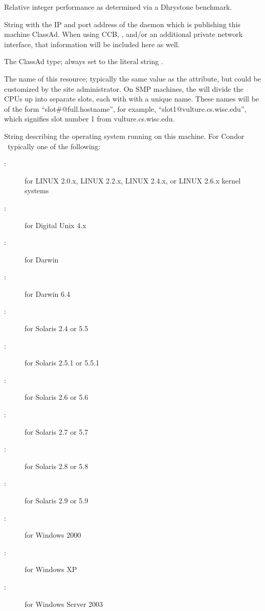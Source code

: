 \begin{description}
%
\item[\AdAttr{Mips}:] Relative integer performance as determined via a Dhrystone
benchmark.
%
\item[\AdAttr{MyAddress}:] String with the IP and port address of the
 daemon which is publishing this machine ClassAd.
When using CCB, , and/or an additional private
network interface, that information will be included here as well.
%
\item[\AdAttr{MyType}:] The ClassAd type; always set to the literal string .
%
\item[\AdAttr{Name}:] The name of this resource; typically the same value as
the  attribute, but could be customized by the site
administrator.
On SMP machines, the  will divide the CPUs up into separate
slots, each with with a unique name.
These names will be of the form ``slot\#@full.hostname'', for example,
``slot1@vulture.cs.wisc.edu'', which signifies slot number 1 from
vulture.cs.wisc.edu.
%
\item[\AdAttr{OpSys}:] String describing the operating system running on this
machine.  For Condor \VersionNotice\ typically one of the following:
	\begin{description}
	\item[:] for LINUX 2.0.x, LINUX 2.2.x,
	LINUX 2.4.x, or LINUX 2.6.x kernel systems
	\item[:] for Digital Unix 4.x
	\item[:] for Darwin
	\item[:] for Darwin 6.4
	\item[:] for Solaris 2.4 or 5.5
	\item[:] for Solaris 2.5.1 or 5.5.1
	\item[:] for Solaris 2.6 or 5.6
	\item[:] for Solaris 2.7 or 5.7
	\item[:] for Solaris 2.8 or 5.8
	\item[:] for Solaris 2.9 or 5.9
	\item[:] for Windows 2000
	\item[:] for Windows XP
	\item[:] for Windows Server 2003

\end{description}
\end{description}

